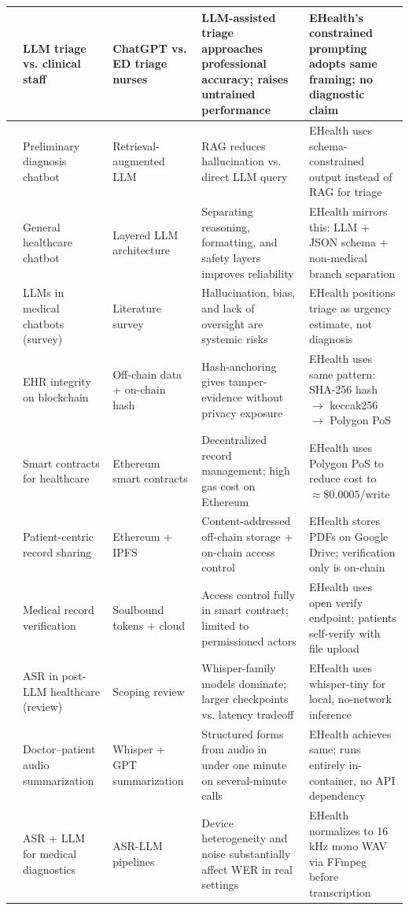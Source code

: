 {\begin{xltabular}{\textwidth}{|>{\centering\arraybackslash}p{0.8cm}|>{\raggedright\arraybackslash}p{2.0cm}|>{\raggedright\arraybackslash}p{2.2cm}|>{\raggedright\arraybackslash}X|>{\raggedright\arraybackslash}p{3.5cm}|}
\cite{triage_llm_2024} & LLM triage vs. clinical staff & ChatGPT vs. ED triage nurses & LLM-assisted triage approaches professional accuracy; raises untrained performance & EHealth's constrained prompting adopts same framing; no diagnostic claim \\
\hline
\cite{inclusive_healthcare_2025} & Preliminary diagnosis chatbot & Retrieval-augmented LLM & RAG reduces hallucination vs. direct LLM query & EHealth uses schema-constrained output instead of RAG for triage \\
\hline
\cite{healthcare_chatbot_2025} & General healthcare chatbot & Layered LLM architecture & Separating reasoning, formatting, and safety layers improves reliability & EHealth mirrors this: LLM + JSON schema + non-medical branch separation \\
\hline
\cite{llm_chatbot_risks_2025} & LLMs in medical chatbots (survey) & Literature survey & Hallucination, bias, and lack of oversight are systemic risks & EHealth positions triage as urgency estimate, not diagnosis \\
\hline
\cite{medical_blockchain_ehr_2022} & EHR integrity on blockchain & Off-chain data + on-chain hash & Hash-anchoring gives tamper-evidence without privacy exposure & EHealth uses same pattern: SHA-256 hash $\rightarrow$ keccak256 $\rightarrow$ Polygon PoS \\
\hline
\cite{blockchain_healthcare_2020} & Smart contracts for healthcare & Ethereum smart contracts & Decentralized record management; high gas cost on Ethereum & EHealth uses Polygon PoS to reduce cost to $\approx \$0.0005$/write \\
\hline
\cite{blockchain_record_sharing_2025} & Patient-centric record sharing & Ethereum + IPFS & Content-addressed off-chain storage + on-chain access control & EHealth stores PDFs on Google Drive; verification only is on-chain \\
\hline
\cite{blockchain_soulbound_2024} & Medical record verification & Soulbound tokens + cloud & Access control fully in smart contract; limited to permissioned actors & EHealth uses open verify endpoint; patients self-verify with file upload \\
\hline
\cite{asr_healthcare_2026} & ASR in post-LLM healthcare (review) & Scoping review & Whisper-family models dominate; larger checkpoints vs. latency tradeoff & EHealth uses whisper-tiny for local, no-network inference \\
\hline
\cite{llm_transcription_2024} & Doctor--patient audio summarization & Whisper + GPT summarization & Structured forms from audio in under one minute on several-minute calls & EHealth achieves same; runs entirely in-container, no API dependency \\
\hline
\cite{asr_llm_benchmarking_2025} & ASR + LLM for medical diagnostics & ASR-LLM pipelines & Device heterogeneity and noise substantially affect WER in real settings & EHealth normalizes to 16\,kHz mono WAV via FFmpeg before transcription \\
\hline


\end{xltabular}}
